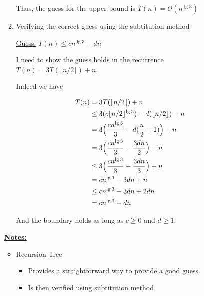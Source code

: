 \documentclass[12pt]{article}
\begin{document}
\begin{enumerate}[1.]
\begin{enumerate}[1.]
        \bigskip

        Thus, the guess for the upper bound is $T(n) = \mathcal{O}(n^{\lg 3})$

        \bigskip

        \item Verifying the correct guess using the subtitution method

        \bigskip

        \underline{Guess:} $T(n) \leq cn^{\lg 3} - dn$

        \bigskip

        I need to show the guess holds in the recurrence $T(n) = 3T(\lfloor n/2 \rfloor) + n$.

        \bigskip

        Indeed we have

        \begin{align}
            T(n) &= 3T(\lfloor n/2 \rfloor) + n \\
            &\leq 3(c \lfloor n/2 \rfloor^{\lg 3}) - d(\lfloor n/2 \rfloor) + n\\
            &= 3\Bigl(\frac{cn^{\lg 3}}{3} - d(\frac{n}{2} + 1) \Bigr) + n\\
            &= 3\Bigl(\frac{cn^{\lg 3}}{3} - \frac{3dn}{2} \Bigr) + n\\
            &\leq 3\Bigl(\frac{cn^{\lg 3}}{3} - \frac{3dn}{3} \Bigr) + n\\
            &= cn^{\lg 3} - 3dn + n\\
            &\leq cn^{\lg 3} - 3dn + 2dn\\
            &= cn^{\lg 3} - dn
        \end{align}

        \bigskip

        And the boundary holds as long as $c \geq 0$ and $d \geq 1$.
    \end{enumerate}

    \bigskip

    \underline{\textbf{Notes:}}

    \bigskip

    \begin{itemize}
        \item Recursion Tree

        \begin{itemize}
            \item Provides a straightforward way to provide a good guess.
            \item Is then verified using subtitution method
        \end{itemize}


\end{itemize}
\end{enumerate}
\end{document}
